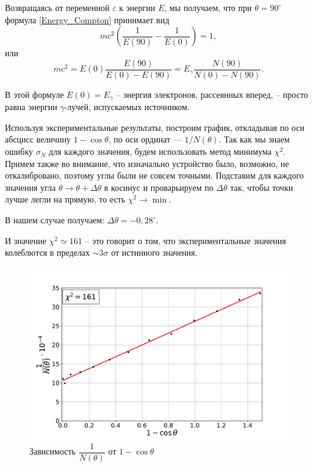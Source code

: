 	Возвращаясь от переменной $\varepsilon$ к энергии $E$, мы получаем, что при $\theta = 90^\circ$ формула \eqref{Energy_Compton} принимает вид
	\begin{equation*}
		mc^2 \left(\frac{1}{E(90)} - \frac{1}{E(0)}\right) = 1,
	\end{equation*}
	\noindent или
	\begin{equation}
		mc^2 = E(0)\frac{E(90)}{E(0) - E(90)} = E_\gamma \frac{N(90)}{N(0) - N(90)}.
		\label{Compton_mc2}
	\end{equation}
	
	В этой формуле $E(0) = E_\gamma$ -- энергия электронов, рассеянных вперед, -- просто равна энергии $\gamma$-лучей, испускаемых источником.
	
	
	Используя экспериментальные результаты, построим график, откладывая по оси абсцисс величину $1 - \cos\theta$, по оси ординат --- $1 / N(\theta)$. Так как мы знаем ошибку $\sigma_N$ для каждого значения, будем использовать метод минимума $\chi^2$. Примем также во внимание, что изначально устройство было, возможно, не откалибровано, поэтому углы были не совсем точными. Подставим для каждого значения угла $\theta \longrightarrow \theta + \Delta \theta$ в косинус и проварьируем по $\Delta\theta$ так, чтобы точки лучше легли на прямую, то есть $\chi^2 \rightarrow \min$.
	
	
	В нашем случае получаем: $\Delta \theta = -0,28^\circ$.
	
	И значение $\chi^2 \simeq 161$ -- это говорит о том, что экспериментальные значения колеблются в пределах $\sim 3\sigma$ от истинного значения.
	
	\newpage
	\begin{figure}[h!]
		\centering
		\includegraphics[width=\linewidth]{Pictures/N(theta).pdf}
		\caption{Зависимость $\dfrac{1}{N(\theta)}$ от $1 - \cos \theta$}
	\end{figure}

